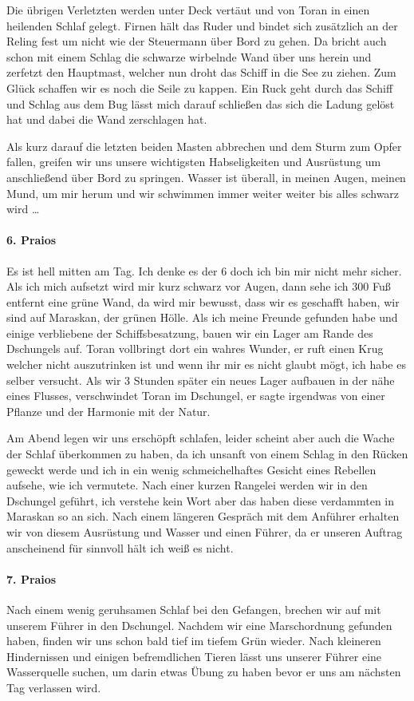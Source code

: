 Die übrigen Verletzten werden unter Deck vertäut und von Toran in einen heilenden Schlaf gelegt. Firnen hält das Ruder und bindet sich zusätzlich an der Reling fest um nicht wie der Steuermann über Bord zu gehen. Da bricht auch schon mit einem Schlag die schwarze wirbelnde Wand über uns herein und zerfetzt den Hauptmast, welcher nun droht das Schiff in die See zu ziehen. Zum Glück schaffen wir es noch die Seile zu kappen. Ein Ruck geht durch das Schiff und Schlag aus dem Bug lässt mich darauf schließen das sich die Ladung gelöst hat und dabei die Wand zerschlagen hat. 

Als kurz darauf die letzten beiden Masten abbrechen und dem Sturm zum Opfer fallen, greifen wir uns unsere wichtigsten Habseligkeiten und Ausrüstung um anschließend über Bord zu springen. Wasser ist überall, in meinen Augen, meinen Mund, um mir herum und wir schwimmen immer weiter weiter bis alles schwarz wird \dots

\paragraph{6. Praios}
Es ist hell mitten am Tag. Ich denke es der 6 doch ich bin mir nicht mehr sicher.
Als ich mich aufsetzt wird mir kurz schwarz vor Augen, dann sehe ich 300 Fuß entfernt eine grüne Wand, da wird mir bewusst, dass wir es geschafft haben, wir sind auf Maraskan, der grünen Hölle. Als ich meine Freunde gefunden habe und einige verbliebene der Schiffsbesatzung, bauen wir ein Lager am Rande des Dschungels auf. Toran vollbringt dort ein wahres Wunder, er ruft einen Krug welcher nicht auszutrinken ist und wenn ihr mir es nicht glaubt mögt, ich habe es selber versucht. Als wir 3 Stunden später ein neues Lager aufbauen in der nähe eines Flusses, verschwindet Toran im Dschungel, er sagte irgendwas von einer Pflanze und der Harmonie mit der Natur.

Am Abend legen wir uns erschöpft schlafen, leider scheint aber auch die Wache der Schlaf überkommen zu haben, da ich unsanft von einem Schlag in den Rücken geweckt werde und ich in ein wenig schmeichelhaftes Gesicht eines Rebellen aufsehe, wie ich vermutete. Nach einer kurzen Rangelei werden wir in den Dschungel geführt, ich verstehe kein Wort aber das haben diese verdammten in Maraskan so an sich. Nach einem längeren Gespräch mit dem Anführer erhalten wir von diesem Ausrüstung und Wasser und einen Führer, da er unseren Auftrag anscheinend für sinnvoll hält ich weiß es nicht.

\paragraph{7. Praios}
Nach einem wenig geruhsamen Schlaf bei den Gefangen, brechen wir auf mit unserem Führer in den Dschungel. Nachdem wir eine Marschordnung gefunden haben, finden wir uns schon bald tief im tiefem Grün wieder. Nach kleineren Hindernissen und einigen befremdlichen Tieren lässt uns unserer Führer eine Wasserquelle suchen, um darin etwas Übung zu haben bevor er uns am nächsten Tag verlassen wird. 

